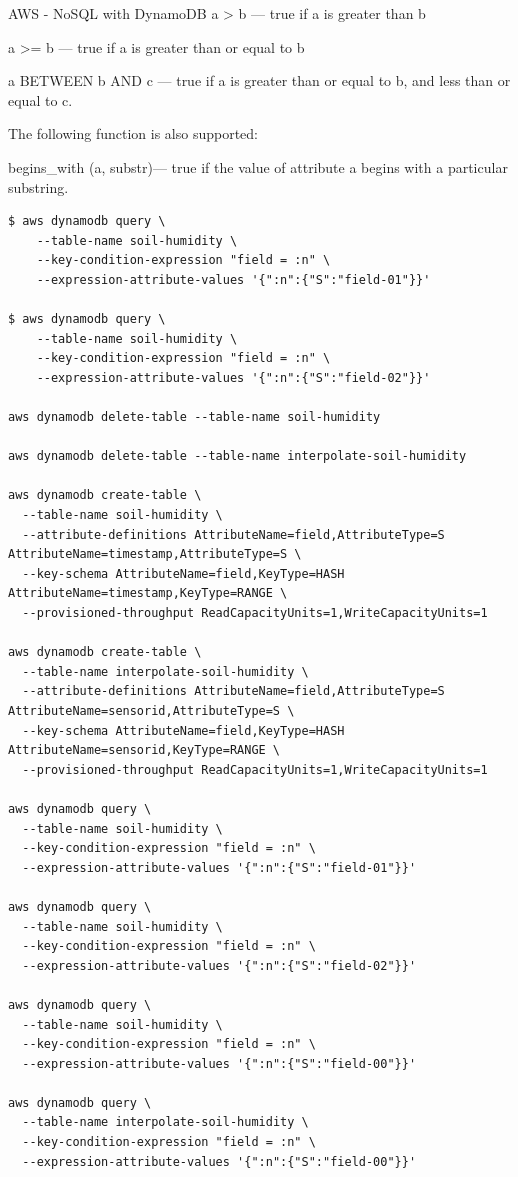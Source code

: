 \begin{frame}{AWS - NoSQL with DynamoDB}
    a > b — true if a is greater than b

    a >= b — true if a is greater than or equal to b

    a BETWEEN b AND c — true if a is greater than or equal to b, and less than or equal to c.

The following function is also supported:

    begins_with (a, substr)— true if the value of attribute a begins with a particular substring.



\begin{lstlisting}
$ aws dynamodb query \
    --table-name soil-humidity \
    --key-condition-expression "field = :n" \
    --expression-attribute-values '{":n":{"S":"field-01"}}'

$ aws dynamodb query \
    --table-name soil-humidity \
    --key-condition-expression "field = :n" \
    --expression-attribute-values '{":n":{"S":"field-02"}}'
    
aws dynamodb delete-table --table-name soil-humidity

aws dynamodb delete-table --table-name interpolate-soil-humidity

aws dynamodb create-table \
  --table-name soil-humidity \
  --attribute-definitions AttributeName=field,AttributeType=S AttributeName=timestamp,AttributeType=S \
  --key-schema AttributeName=field,KeyType=HASH AttributeName=timestamp,KeyType=RANGE \
  --provisioned-throughput ReadCapacityUnits=1,WriteCapacityUnits=1

aws dynamodb create-table \
  --table-name interpolate-soil-humidity \
  --attribute-definitions AttributeName=field,AttributeType=S AttributeName=sensorid,AttributeType=S \
  --key-schema AttributeName=field,KeyType=HASH AttributeName=sensorid,KeyType=RANGE \
  --provisioned-throughput ReadCapacityUnits=1,WriteCapacityUnits=1

aws dynamodb query \
  --table-name soil-humidity \
  --key-condition-expression "field = :n" \
  --expression-attribute-values '{":n":{"S":"field-01"}}'

aws dynamodb query \
  --table-name soil-humidity \
  --key-condition-expression "field = :n" \
  --expression-attribute-values '{":n":{"S":"field-02"}}'

aws dynamodb query \
  --table-name soil-humidity \
  --key-condition-expression "field = :n" \
  --expression-attribute-values '{":n":{"S":"field-00"}}'

aws dynamodb query \
  --table-name interpolate-soil-humidity \
  --key-condition-expression "field = :n" \
  --expression-attribute-values '{":n":{"S":"field-00"}}'
\end{lstlisting}


\end{frame}
